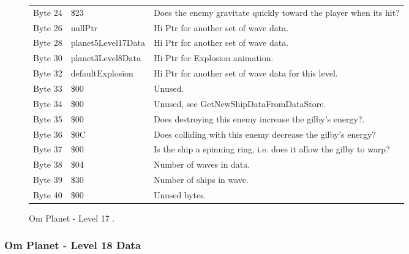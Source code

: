 \begin{figure}[H]
{\begin{adjustbox}{width=12cm}
\begin{tabular}{lll}
 Byte 24 & \$23                & Does the enemy gravitate quickly toward the player when its hit?   \\
 Byte 26 & nullPtr            & Hi Ptr for another set of wave data.                               \\
 Byte 28 & planet5Level17Data & Hi Ptr for another set of wave data.                               \\
 Byte 30 & planet3Level8Data  & Hi Ptr for Explosion animation.                                    \\
 Byte 32 & defaultExplosion   & Hi Ptr for another set of wave data for this level.                \\
 Byte 33 & \$00                & Unused.                                                            \\
 Byte 34 & \$00                & Unused, see GetNewShipDataFromDataStore.                           \\
 Byte 35 & \$00                & Does destroying this enemy increase the gilby's energy?.           \\
 Byte 36 & \$0C                & Does colliding with this enemy decrease the gilby's energy?        \\
 Byte 37 & \$00                & Is the ship a spinning ring, i.e. does it allow the gilby to warp? \\
 Byte 38 & \$04                & Number of waves in data.                                           \\
 Byte 39 & \$30                & Number of ships in wave.                                           \\
 Byte 40 & \$00                & Unused bytes.                                                      \\
\bottomrule
\end{tabular}

  \end{adjustbox}

  }\caption*{Om Planet - Level 17
.}
\end{figure}

\clearpage
\subsubsection{Om Planet - Level 18 Data}

